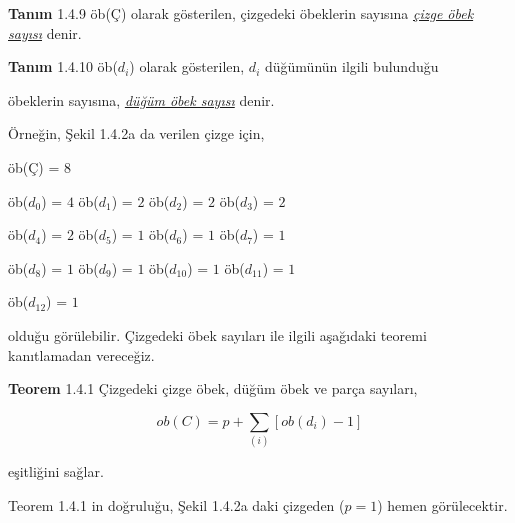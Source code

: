\documentclass[11pt, twoside, a4paper]{article}
\numberwithin{equation}{section}
\numberwithin{figure}{section}
\begin{document}
\textbf{Tanım} \hspace{0.7cm} 1.4.9 \hspace{0.7cm} öb(Ç) olarak gösterilen, çizgedeki öbeklerin sayısına \textit{\underline{çizge öbek sayısı}} \vspace{0.25cm}
\hspace{4.25cm} denir. 

\textbf{Tanım} \hspace{0.7cm} 1.4.10 \hspace{0.4cm} öb($d_i$) olarak gösterilen, $d_i$ düğümünün ilgili bulunduğu \vspace{0.25cm}

\hspace{3.7cm} öbeklerin sayısına,  \textit{\underline{düğüm öbek sayısı}} denir.	\vspace{0.25cm}

Örneğin, Şekil 1.4.2a da verilen çizge için,

\begin{center}
öb(Ç) = $8$
\end{center}

öb($d_0$) = $4$          \hspace{2cm}                   öb($d_1$) = $2$                 \hspace{2cm}                 öb($d_2$) = $2$                \hspace{2cm}                        öb($d_3$) = $2$	  \vspace{0.25cm}

öb($d_4$) = $2$	 \hspace{2cm}	öb($d_5$) = $1$	 \hspace{2cm}	öb($d_6$) = $1$	 \hspace{2cm}	öb($d_7$) = $1$ 	\vspace{0.25cm}

öb($d_8$) = $1$	 \hspace{2cm}	öb($d_9$) = $1$	 \hspace{2cm}	öb($d_10$) = $1$  \hspace{1.85cm}	öb($d_{11}$) = $1$	\vspace{0.25cm}

öb($d_{12}$) = $1$ \vspace{0.25cm}

olduğu görülebilir. Çizgedeki öbek sayıları ile ilgili aşağıdaki teoremi kanıtlamadan \vspace{0.25cm}
\hspace{0.5cm} vereceğiz. \vspace{0.25cm}

\textbf{Teorem} \hspace{0.7cm} 1.4.1 \hspace{0.7cm} Çizgedeki çizge öbek, düğüm öbek ve parça sayıları, 

\begin{center}
$$ ob(C) =  p +  \sum_{(i)} [ob(d_i) - 1] $$
\end{center}

\hspace{4.5cm}  eşitliğini sağlar. \vspace{0.25cm}

Teorem 1.4.1 in doğruluğu, Şekil 1.4.2a daki çizgeden ($p=1$) hemen görülecektir.
\end{document}
